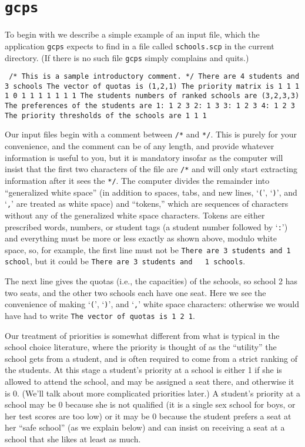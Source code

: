 \documentclass[12pt]{article}
\theoremstyle{definition}
\begin{document}
\section{\texttt{gcps}}

To begin with we describe a simple example of an input file, which the
application \texttt{gcps} expects to find in a file called
\texttt{schools.scp} in the current directory.  (If there is no such
file \texttt{gcps} simply complains and quits.)

\begin{obeylines}\texttt{
/* This is a sample introductory comment. */
There are 4 students and 3 schools
The vector of quotas is (1,2,1)
The priority matrix is
     1     1     1
     1     0     1
     1     1     1
     1     1     1
The students numbers of ranked schools are (3,2,3,3)
The preferences of the students are
1:  1  2  3  
2:  1  3  
3:  1  2  3  
4:  1  2  3  
The priority thresholds of the schools are
1   1   1   
  }
\end{obeylines}

\medskip

Our input files begin with a comment between \texttt{/*} and
\texttt{*/}.  This is purely for your convenience, and the comment can
be of any length, and provide whatever information is useful to you,
but it is mandatory insofar as the computer will insist that the first
two characters of the file are \texttt{/*} and will only start
extracting information after it sees the \texttt{*/}.  The computer
divides the remainder into ``generalized white space'' (in addition to
spaces, tabs, and new lines, `\texttt{(}', `\texttt{)}', and
`\texttt{,}' are treated as white space) and ``tokens,'' which are
sequences of characters without any of the generalized white space
characters.  Tokens are either prescribed words, numbers, or student
tags (a student number followed by `\texttt{:}') and everything must
be more or less exactly as shown above, modulo white space, so, for
example, the first line must not be \texttt{There are 3 students and 1
  school}, but it could be \texttt{There are 3 students and \ \ 1
  schools}.

The next line gives the quotas (i.e., the capacities) of the schools,
so school 2 has two seats, and the other two schools each have one
seat.  Here we see the convenience of making `\texttt{(}',
`\texttt{)}', and `\texttt{,}' white space characters: otherwise we
would have had to write \texttt{The vector of quotas is 1 2 1}.

Our treatment of priorities is somewhat different from what is typical
in the school choice literature, where the priority is thought of as
the ``utility'' the school gets from a student, and is often required
to come from a strict ranking of the students.  At this stage a
student's priority at a school is either 1 if she is allowed to attend
the school, and may be assigned a seat there, and otherwise it is 0.
(We'll talk about more complicated priorities later.)  A student's
priority at a school may be 0 because she is not qualified (it is a
single sex school for boys, or her test scores are too low) or it may
be 0 because the student prefers a seat at her ``safe school'' (as we
explain below) and can insist on receiving a seat at a school that she
likes at least as much.
\end{document}

